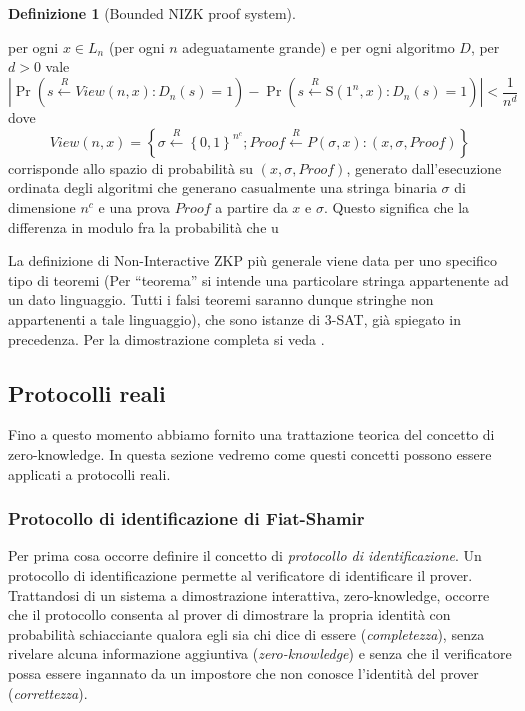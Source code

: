 \documentclass{article}
\theoremstyle{definition}
\newtheorem{definizione}{Definizione}
\begin{document}
\begin{definizione}[Bounded NIZK proof system]
\begin{enumerate}
        per ogni $x \in L_n$ (per ogni $n$ adeguatamente grande) e per ogni algoritmo $D$, per $d > 0$ vale 
        \begin{equation*}
            \left| \Pr\left(s \overset{R}{\leftarrow}View(n,x) : D_n(s) = 1\right) - \Pr \left(s \overset{R}{\leftarrow}\mathrm{S}(1^n, x) : D_n(s) = 1 \right) \right| < \frac{1}{n^d}
        \end{equation*} 
        dove 
        \begin{equation*}
            View(n,x) = \left\{ \sigma \overset{R}{\leftarrow} \left\{ 0, 1\right\}^{n^c}; Proof \overset{R}{\leftarrow}P(\sigma, x) : (x, \sigma, Proof)  \right\}
        \end{equation*}  
        corrisponde allo spazio di probabilità su $(x, \sigma, Proof)$, generato dall'esecuzione ordinata degli algoritmi che generano casualmente una stringa binaria $\sigma$ di dimensione $n^c$ e una prova $Proof$ a partire da $x$ e $\sigma$. Questo significa che la differenza in modulo fra la probabilità che u
    \end{enumerate}
\end{definizione}

La definizione di Non-Interactive ZKP più generale viene data per uno specifico tipo di teoremi (Per ``teorema'' si intende una particolare stringa appartenente ad un dato linguaggio. Tutti i falsi teoremi saranno dunque stringhe non appartenenti a tale linguaggio), che sono istanze di 3-SAT, già spiegato in precedenza.
Per la dimostrazione completa si veda \cite[pp.1105-1106]{noninteractive}.


\subsection{Protocolli reali}
Fino a questo momento abbiamo fornito una trattazione teorica del concetto di zero-knowledge. In questa sezione vedremo come questi concetti possono essere applicati a protocolli reali.

\subsubsection{Protocollo di identificazione di Fiat-Shamir}
Per prima cosa occorre definire il concetto di \emph{protocollo di identificazione}. Un protocollo di identificazione permette al verificatore di identificare il prover. 
Trattandosi di un sistema a dimostrazione interattiva, zero-knowledge, occorre che il protocollo consenta al prover di dimostrare la propria identità con probabilità schiacciante qualora egli sia chi dice di essere (\emph{completezza}), senza rivelare alcuna informazione aggiuntiva (\emph{zero-knowledge}) e senza che il verificatore possa essere ingannato da un impostore che non conosce l'identità del prover (\emph{correttezza}).
\end{document}
